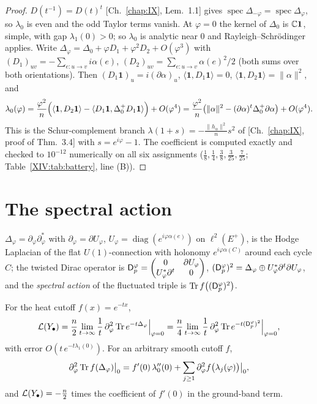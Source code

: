\begin{proof}
$D(t^{-1})=D(t)^{t}$ [Ch.~\ref{chap:IX}, Lem.~1.1] gives $\operatorname{spec}\Delta_{-\varphi}=
\operatorname{spec}\Delta_\varphi$, so $\lambda_0$ is even and the odd Taylor terms vanish.
At $\varphi=0$ the kernel of $\Delta_0$ is $\mathbb{C}\mathbf1$, simple, with gap $\lambda_1(0)>0$; so
$\lambda_0$ is analytic near $0$ and Rayleigh--Schr\"odinger applies. Write
$\Delta_\varphi=\Delta_0+\varphi D_1+\varphi^{2}D_2+O(\varphi^{3})$ with
$(D_1)_{uv}=-\sum_{e\colon u\to v}i\alpha(e)$, $(D_2)_{uv}=\sum_{e\colon u\to v}\alpha(e)^{2}/2$
(both sums over both orientations). Then $(D_1\mathbf1)_u=i(\partial\alpha)_u$,
$\langle\mathbf1,D_1\mathbf1\rangle=0$, $\langle\mathbf1,D_2\mathbf1\rangle=\|\alpha\|^{2}$, and
\[
\lambda_0(\varphi)=\frac{\varphi^{2}}n\Bigl(\langle\mathbf1,D_2\mathbf1\rangle
-\langle D_1\mathbf1,\Delta_0^{+}D_1\mathbf1\rangle\Bigr)+O(\varphi^{4})
=\frac{\varphi^{2}}n\bigl(\|\alpha\|^{2}-(\partial\alpha)^{t}\Delta_0^{+}\partial\alpha\bigr)+O(\varphi^{4}).
\]
This is the Schur-complement branch $\lambda(1+s)=-\frac{\|h_\alpha\|^{2}}ns^{2}$ of
[Ch.~\ref{chap:IX}, proof of Thm.~3.4] with $s=e^{i\varphi}-1$. The coefficient is computed exactly and
checked to $10^{-12}$ numerically on all six assignments ($\frac18,\frac14,\frac38,\frac3{25},\frac7{25}$;
Table~\ref{XIV:tab:battery}, line (B)).
\end{proof}

\section{The spectral action}\label{XIV:sec:action}

$\Delta_\varphi=\partial_\varphi\partial_\varphi^{*}$ with $\partial_\varphi=\partial U_\varphi$,
$U_\varphi=\operatorname{diag}(e^{i\varphi\alpha(e)})$ on $\ell^{2}(E^{+})$, is the Hodge
Laplacian of the flat $U(1)$-connection with holonomy $e^{i\varphi\alpha(C)}$ around each
cycle $C$; the twisted Dirac operator is
$\mathsf{D}_p^{\varphi}=\begin{pmatrix}0&\partial U_\varphi\\U_\varphi^{*}\partial^{t}&0\end{pmatrix}$,
$(\mathsf{D}_p^{\varphi})^{2}=\Delta_\varphi\oplus U_\varphi^{*}\partial^{t}\partial U_\varphi$, and the
\emph{spectral action} \cite{CC} of the fluctuated triple is $\operatorname{Tr} f\bigl((\mathsf{D}_p^{\varphi})^{2}\bigr)$.

\begin{theorem}\label{XIV:thm:action}
For the heat cutoff $f(x)=e^{-tx}$,
\[
\mathcal{L}(Y_\bullet)=\frac n2\lim_{t\to\infty}\frac1t\,\partial_\varphi^{2}\operatorname{Tr} e^{-t\Delta_\varphi}\Big|_{\varphi=0}
=\frac n4\lim_{t\to\infty}\frac1t\,\partial_\varphi^{2}\operatorname{Tr} e^{-t(\mathsf{D}_p^{\varphi})^{2}}\Big|_{\varphi=0},
\]
with error $O(t\,e^{-t\lambda_1(0)})$. For an arbitrary smooth cutoff $f$,
\[
\partial_\varphi^{2}\operatorname{Tr} f(\Delta_\varphi)\big|_{0}=f'(0)\,\lambda_0''(0)+\sum_{j\ge1}\partial_\varphi^{2}f\bigl(\lambda_j(\varphi)\bigr)\big|_0 ,
\]
and $\mathcal{L}(Y_\bullet)=-\frac n2$ times the coefficient of $f'(0)$ in the ground-band term.
\end{theorem}

